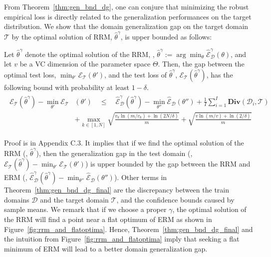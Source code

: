 From Theorem~\ref{thm:gen_bnd_dg}, one can conjure that minimizing the robust empirical loss is directly related to the generalization performances on the target distribution.
We show that the domain generalization gap on the target domain $\mathcal T$ by the optimal solution of RRM, $\hat{\theta}^{\gamma}$, is upper bounded as follows:
\begin{theorem}\label{thm:gen_bnd_dg_final}
Let $\hat{\theta}^{\gamma}$ denote the optimal solution of the RRM, \ie, $\hat{\theta}^{\gamma}:=\arg\min_{\theta}\hat{\mathcal{E}}^{\gamma}_{\mathcal{D}}(\theta)$, and let $v$ be a VC dimension of the parameter space $\Theta$.
Then, the gap between the optimal test loss, $\min_{\theta'}\mathcal{E}_{\mathcal{T}}\left(\theta'\right)$, and the test loss of $\hat{\theta}^{\gamma}$, $\mathcal{E}_{\mathcal{T}}(\hat{\theta}^{\gamma})$, has the following bound with probability at least $1-\delta$.
\begin{align}
\begin{split}
    \mathcal{E}_{\mathcal{T}}(\hat{\theta}^{\gamma}) - \min_{\theta'}\mathcal{E}_{\mathcal{T}}&\left(\theta'\right) \quad \leq \quad \hat{\mathcal{E}}_{\mathcal{D}}^{\gamma}(\hat{\theta}^{\gamma}) - \min_{\theta''}\hat{\mathcal{E}}_{\mathcal{D}}(\theta'') + \frac{1}{I}\sum_{i=1}^{I}\mathbf{Div}(\mathcal{D}_{i},\mathcal{T})\\
    &+ \max_{k\in[1,N]} \sqrt{\frac{v_{k}\ln\left(m/v_{k}\right)+\ln\left(2N/\delta\right)}{m}} + \sqrt{\frac{v\ln\left(m/v\right) + \ln\left(2/\delta\right)}{m}}
\end{split}
\end{align}
\end{theorem}
Proof is in Appendix C.3. It implies that if we find the optimal solution of the RRM (\ie, $\hat{\theta}^{\gamma}$), then the generalization gap in the test domain (\ie, $\mathcal{E}_{\mathcal{T}}(\hat{\theta}^{\gamma}) - \min_{\theta'}\mathcal{E}_{\mathcal{T}}\left(\theta'\right)$) is upper bounded by the gap between the RRM and ERM (\ie,
$\hat{\mathcal{E}}_{\mathcal{D}}^{\gamma}(\hat{\theta}^{\gamma}) - \min_{\theta''}\hat{\mathcal{E}}_{\mathcal{D}}(\theta'')$).
Other terms in Theorem~\ref{thm:gen_bnd_dg_final} are the discrepancy between the train domains $\mathcal D$ and the target domain $\mathcal T$, and the confidence bounds caused by sample means.
We remark that if we choose a proper $\gamma$, the optimal solution of the RRM will find a point near a flat optimum of ERM as shown in Figure~\ref{fig:rrm_and_flatoptima}.
Hence, Theorem~\ref{thm:gen_bnd_dg_final} and the intuition from Figure~\ref{fig:rrm_and_flatoptima} imply that seeking a flat minimum of ERM will lead to a better domain generalization gap.
